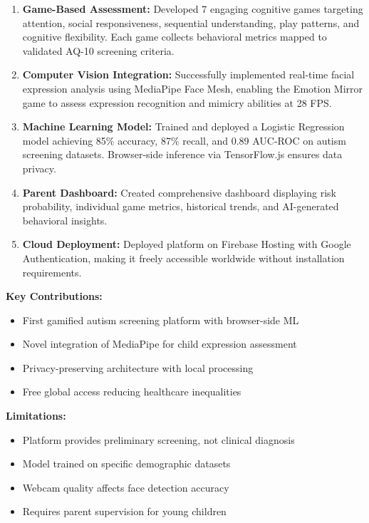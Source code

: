 \documentclass[12pt,letterpaper]{article}
\begin{document}
\begin{enumerate}
    \item \textbf{Game-Based Assessment:} Developed 7 engaging cognitive games targeting attention, social responsiveness, sequential understanding, play patterns, and cognitive flexibility. Each game collects behavioral metrics mapped to validated AQ-10 screening criteria.
    
    \item \textbf{Computer Vision Integration:} Successfully implemented real-time facial expression analysis using MediaPipe Face Mesh, enabling the Emotion Mirror game to assess expression recognition and mimicry abilities at 28 FPS.
    
    \item \textbf{Machine Learning Model:} Trained and deployed a Logistic Regression model achieving 85\% accuracy, 87\% recall, and 0.89 AUC-ROC on autism screening datasets. Browser-side inference via TensorFlow.js ensures data privacy.
    
    \item \textbf{Parent Dashboard:} Created comprehensive dashboard displaying risk probability, individual game metrics, historical trends, and AI-generated behavioral insights.
    
    \item \textbf{Cloud Deployment:} Deployed platform on Firebase Hosting with Google Authentication, making it freely accessible worldwide without installation requirements.
\end{enumerate}

\textbf{Key Contributions:}
\begin{itemize}
    \item First gamified autism screening platform with browser-side ML
    \item Novel integration of MediaPipe for child expression assessment
    \item Privacy-preserving architecture with local processing
    \item Free global access reducing healthcare inequalities
\end{itemize}

\textbf{Limitations:}
\begin{itemize}
    \item Platform provides preliminary screening, not clinical diagnosis
    \item Model trained on specific demographic datasets
    \item Webcam quality affects face detection accuracy
    \item Requires parent supervision for young children
\end{itemize}
\end{document}
